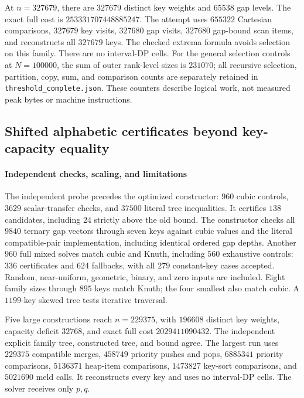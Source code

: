 \documentclass[11pt]{article}
\begin{document}
At $n=327679$, there are $327679$ distinct key weights and $65538$
gap levels. The exact full cost is $253331707448885247$. The attempt uses
$655322$ Cartesian comparisons, $327679$ key visits, $327680$ gap visits,
$327680$ gap-bound scan items, and reconstructs all $327679$ keys.
The checked extrema formula avoids selection on this family. There are
no interval-DP cells. For the general selection controls at $N=100000$,
the sum of outer rank-level sizes is $231070$; all recursive selection,
partition, copy, sum, and comparison counts are separately retained in
\texttt{threshold\_complete.json}. These counters describe logical work,
not measured peak bytes or machine instructions.


\subsection{Shifted alphabetic certificates beyond key-capacity equality}
\paragraph{Independent checks, scaling, and limitations}\label{sec:legacy-27-2}
The independent probe precedes the optimized constructor: $960$ cubic
controls, $3629$ scalar-transfer checks, and $37500$ literal tree inequalities.
It certifies $138$ candidates, including $24$ strictly above the old bound.
The constructor checks all $9840$ ternary gap vectors through seven keys
against cubic values and the literal compatible-pair implementation,
including identical ordered gap depths. Another $960$ full mixed solves
match cubic and Knuth, including $560$ exhaustive controls: $336$
certificates and $624$ fallbacks, with all $279$ constant-key cases accepted.
Random, near-uniform, geometric, binary, and zero inputs are included.
Eight family sizes through $895$ keys match Knuth; the four smallest also
match cubic. A $1199$-key skewed tree tests iterative traversal.

Five large constructions reach $n=229375$, with $196608$ distinct key
weights, capacity deficit $32768$, and exact full cost $2029411090432$.
The independent explicit family tree, constructed tree, and bound agree.
The largest run uses $229375$ compatible merges, $458749$ priority pushes
and pops, $6885341$ priority comparisons, $5136371$ heap-item comparisons,
$1473827$ key-sort comparisons, and $5021690$ meld calls. It reconstructs
every key and uses no interval-DP cells. The solver receives only $p,q$.
\end{document}
